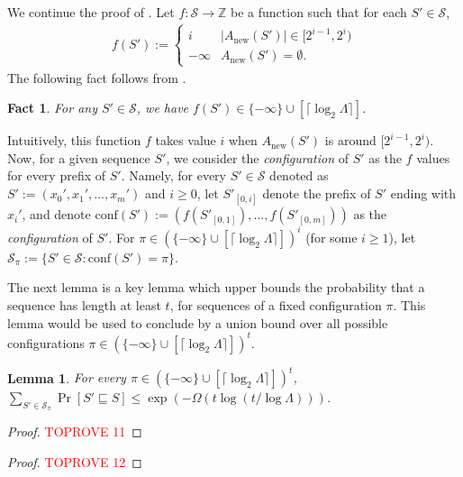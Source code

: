 \documentclass[11pt,letterpaper]{article}
\theoremstyle{plain}
\newtheorem{lemma}[theorem]{Lemma}
\newtheorem{fact}[theorem]{Fact}
\theoremstyle{definition}
\theoremstyle{remark}
\newcommand{\Anew}{\ensuremath{A_{\mathrm{new}}}\xspace}
\newcommand{\conf}{\ensuremath{\mathrm{conf}}\xspace}
\begin{document}
        We continue the proof of .
Let $f: \mathcal{S}\to \mathbb{Z}$ be a function such that for each $S'\in \mathcal{S}$,  
        \begin{align*}
            f(S') := \begin{cases}
               i & |\Anew(S')| \in [2^{i-1}, 2^{i})  \\
               -\infty &  \Anew(S') = \emptyset.
            \end{cases}
        \end{align*}
        The following fact follows from .
        \begin{fact}
            For any $S' \in \mathcal{S}$, we have $f(S') \in \{-\infty\} \cup [\lceil \log_2 \Lambda \rceil] $.
        \end{fact}
Intuitively, this function $f$ takes value $i$ when $\Anew(S')$ is around $[2^{i-1}, 2^{i})$. 
Now, for a given sequence $S'$, we consider the \emph{configuration} of $S'$ as the $f$ values for every prefix of $S'$.
Namely, for every $S'\in\mathcal{S}$ denoted as $S':=(x_{0}', x_{1}', \ldots, x_{m}')$ and $i\geq 0$, let $S'_{[0, i]}$ denote the prefix of $S'$ ending with $x_{i}'$, 
        and denote $\conf(S'):= (f(S'_{[0,1]}), \ldots, f(S'_{[0, m]}))$ as the \emph{configuration} of $S'$.
        For $\pi\in (\{-\infty\} \cup [\lceil \log_2\Lambda \rceil])^{i}$ (for some $i\geq 1$), let $\mathcal{S}_{\pi} := \{S'\in \mathcal{S}: \conf(S') = \pi\}$. 

    The next lemma is a key lemma which upper bounds the probability that a sequence has length at least $t$, for sequences of a fixed configuration $\pi$.
    This lemma would be used to conclude  by a union bound over all possible configurations $\pi \in (\{-\infty\} \cup [\lceil\log_2 \Lambda\rceil])^t$.


\begin{lemma}
    \label{lemma:key}
    For every  $\pi\in (\{-\infty\} \cup [\lceil \log_2 \Lambda \rceil])^{t}$, $\sum_{S'\in \mathcal{S}_{\pi}} \Pr[S'\sqsubseteq S]\leq \exp(- \Omega(t\log (t / \log \Lambda)))$. 
\end{lemma}
\begin{proof}\textcolor{red}{TOPROVE 11}\end{proof}


\begin{proof}\textcolor{red}{TOPROVE 12}\end{proof}
\end{document}
